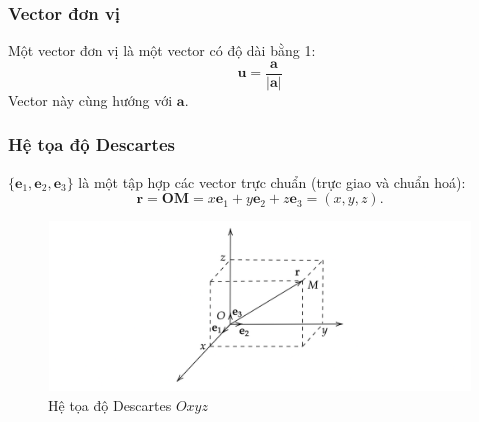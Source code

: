 \begin{frame}
\frametitle{Vector đơn vị}
\begin{tcolorbox}[colback=blue!10, colframe=blue!50!black, title=Định nghĩa]
    Một vector đơn vị là một vector có độ dài bằng 1:
\begin{equation}
    \mathbf{u} = \frac{\mathbf{a}}{|\mathbf{a}|} 
\end{equation}
Vector này  cùng hướng với \(\mathbf{a}\).
\end{tcolorbox}
\end{frame}

\begin{frame}
\frametitle{Hệ tọa độ Descartes}
\(\{\mathbf{e}_1 ,\mathbf{e}_2 ,\mathbf{e}_3\}\) là một tập hợp các vector trực chuẩn (trực giao và chuẩn hoá):
\[
        \mathbf{r}=\mathbf{OM} = x\mathbf{e}_1 + y\mathbf{e}_2 + z\mathbf{e}_3 =(x,y,z).
    \]
\begin{figure}
\centering
\includegraphics[width=12cm, height=4.5cm]{Slides/Figure/toadodescartes.png}
\caption{Hệ tọa độ Descartes \(Oxyz\)}
\end{figure}
\end{frame}

